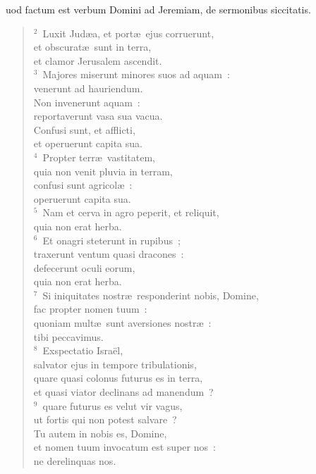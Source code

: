 \bchapter
{}uod factum est verbum Domini ad Jeremiam, de sermonibus siccitatis.
\begin{flushleft}\begin{verse}\vspace{6pt}${}^{2}$~Luxit Jud\ae a, et port\ae\ ejus corruerunt,\\ et obscurat\ae\ sunt in terra,\\ et clamor Jerusalem ascendit.\\
${}^{3}$~Majores miserunt minores suos ad aquam~:\\ venerunt ad hauriendum.\\ Non invenerunt aquam~:\\ reportaverunt vasa sua vacua.\\ Confusi sunt, et afflicti,\\ et operuerunt capita sua.\\
${}^{4}$~Propter terr\ae\ vastitatem,\\ quia non venit pluvia in terram,\\ confusi sunt agricol\ae~:\\ operuerunt capita sua.\\
${}^{5}$~Nam et cerva in agro peperit, et reliquit,\\ quia non erat herba.\\
${}^{6}$~Et onagri steterunt in rupibus~;\\ traxerunt ventum quasi dracones~:\\ defecerunt oculi eorum,\\ quia non erat herba.\\
${}^{7}$~Si iniquitates nostr\ae\ responderint nobis, Domine,\\ fac propter nomen tuum~:\\ quoniam mult\ae\ sunt aversiones nostr\ae~:\\ tibi peccavimus.\\
${}^{8}$~Exspectatio Isra\"el,\\ salvator ejus in tempore tribulationis,\\ quare quasi colonus futurus es in terra,\\ et quasi viator declinans ad manendum~?\\
${}^{9}$~quare futurus es velut vir vagus,\\ ut fortis qui non potest salvare~?\\ Tu autem in nobis es, Domine,\\ et nomen tuum invocatum est super nos~:\\ ne derelinquas nos.\\

\end{verse}
\end{flushleft}
